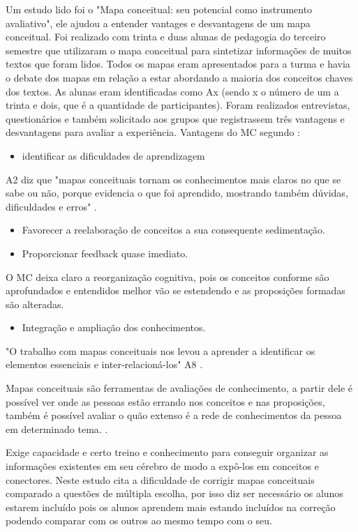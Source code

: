 Um estudo lido foi o "Mapa conceitual: seu potencial como instrumento avaliativo", ele ajudou a entender vantages e desvantagens de um mapa conceitual. Foi realizado com trinta e duas alunas de pedagogia do terceiro semestre que utilizaram o mapa conceitual para sintetizar informações de muitos textos que foram lidos. Todos os mapas eram apresentados para a turma e havia o debate dos mapas em relação a estar abordando a maioria dos conceitos chaves dos textos. As alunas eram identificadas como Ax (sendo x o número de um a trinta e dois, que é a quantidade de participantes). Foram realizados entrevistas, questionários e também solicitado aos grupos que registrassem três vantagens e desvantagens para avaliar a experiência. Vantagens do MC segundo \cite{vantagensDesvantagensMC}: 

\begin{itemize}
\item identificar as dificuldades de aprendizagem
\end{itemize}
A2 diz que "mapas conceituais tornam os conhecimentos mais claros no que se sabe ou não, porque evidencia o que foi aprendido, mostrando também dúvidas, dificuldades e erros" \cite{vantagensDesvantagensMC}.


 \begin{itemize}
\item Favorecer a reelaboração de conceitos a sua consequente sedimentação.
\item Proporcionar feedback quase imediato.
\end{itemize}


 O MC deixa claro a reorganização cognitiva, pois os conceitos conforme são aprofundados e entendidos melhor vão se estendendo e as proposições formadas são alteradas.\cite{vantagensDesvantagensMC}


 \begin{itemize}
\item Integração e ampliação dos conhecimentos.
\end{itemize}
"O trabalho com mapas conceituais nos levou a aprender a identificar os elementos essenciais e inter-relacioná-los" A8 \cite{vantagensDesvantagensMC}.

 Mapas conceituais são ferramentas de avaliações de conhecimento, a partir dele é possível ver onde as pessoas estão errando nos conceitos e nas proposições, também é possível avaliar o quão extenso é a rede de conhecimentos da pessoa em determinado tema. \cite{vantagensDesvantagensMC}.

 Exige capacidade e certo treino e conhecimento para conseguir organizar as informações existentes em seu cérebro de modo a expô-los em conceitos e conectores.
Neste estudo \cite{dificuldadesMapaConceitual} cita a dificuldade de corrigir mapas conceituais comparado a questões de múltipla escolha, por isso diz ser necessário os alunos estarem incluído pois os alunos aprendem mais estando incluídos na correção podendo comparar com os outros ao mesmo tempo com o seu.

